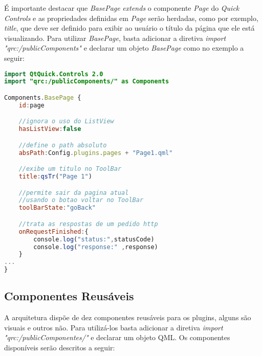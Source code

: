 É importante destacar que \textit{BasePage} \textit{extends} o componente \textit{Page} do \textit{Quick Controls} e as propriedades definidas em \textit{Page} serão herdadas, como por exemplo, \textit{title}, que deve ser definido para exibir ao usuário o título da página que ele está visualizando. Para utilizar \textit{BasePage}, basta adicionar a diretiva \textit{import "qrc:/publicComponents"} e declarar um objeto \textit{BasePage} como no exemplo a seguir:

\begin{center}
\begin{lstlisting}[language=qml]
import QtQuick.Controls 2.0
import "qrc:/publicComponents/" as Components

Components.BasePage {
	id:page

	//ignora o uso do ListView
	hasListView:false

	//define o path absoluto
	absPath:Config.plugins.pages + "Page1.qml"

	//exibe um titulo no ToolBar
	title:qsTr("Page 1")

	//permite sair da pagina atual
	//usando o botao voltar no ToolBar
	toolBarState:"goBack"

	//trata as respostas de um pedido http
	onRequestFinished:{
		console.log("status:",statusCode)
		console.log("response:" ,response)
	}
...
}
\end{lstlisting}
\end{center}


\subsection{Componentes Reusáveis}\label{sec:solucao-desenvolvida}
A arquitetura dispõe de dez componentes reusáveis para os plugins, alguns são visuais e outros não. Para utilizá-los basta adicionar a diretiva \textit{import "qrc:/publicComponentes/"} e declarar um objeto QML. Os componentes disponíveis serão descritos a seguir:

